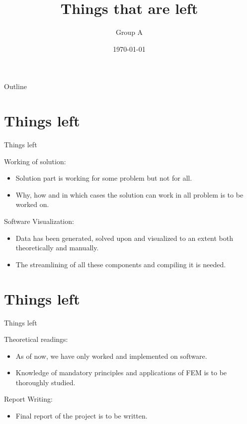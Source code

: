 \documentclass{beamer}
\title{Things that are left}
\author{Group A}
\date{\today}
\begin{document}
\begin{frame}
    \titlepage 
\end{frame}

\logo{}


\begin{frame}{Outline}
    \tableofcontents
\end{frame}


\section{Things left}
\begin{frame}{Things left}

Working of solution:
\begin{itemize}
    \item Solution part is working for some problem but not for all.
    \item Why, how and in which cases the solution can work in all problem is to be worked on.
    
\end{itemize}

Software Visualization:
\begin{itemize}
    \item Data has been generated, solved upon and visualized to an extent both theoretically and manually.
    \item The streamlining of all these components and compiling it is needed.
   
\end{itemize}

\end{frame}

\section{Things left}
\begin{frame}{Things left}

Theoretical readings:
\begin{itemize}
    \item As of now, we have only worked and implemented on software.
    \item Knowledge of mandatory principles and applications of FEM is to be thoroughly studied.
    
\end{itemize}

Report Writing:
\begin{itemize}
    \item Final report of the project is to be written.
    
   
\end{itemize}

\end{frame}
\end{document}
